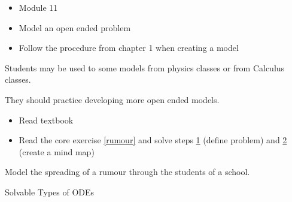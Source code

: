 \begin{lesson}

	\begin{itemize}
		\item Module 11
	\end{itemize}

	\begin{itemize}
		\item Model an open ended problem
		\item Follow the procedure from chapter 1 when creating a model
	\end{itemize}
	

Students may be used to some models from physics classes or from Calculus classes. 

They should practice developing more open ended models.

\begin{itemize}
	\item Read textbook
	\item Read the core exercise \ref{rumour} and solve steps \hyperref[moddefine]{1} (define problem) and \hyperref[mindmap]{2} (create a mind map)
\end{itemize}

\end{lesson}


\question \label{rumour} Model the spreading of a rumour through the students of a school.






\standardonlynewpage



\begin{module}{Solvable Types of ODEs}

	\label{ODE:solve}

	
	

\end{module}


